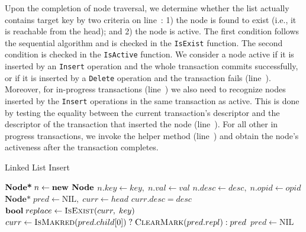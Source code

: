 \documentclass[10pt,conference,compsocconf]{IEEEtran}
\newcommand\NIL{\text{NIL}}
\newcommand\TRUE{\text{\textbf{true}}}
\begin{document}
Upon the completion of node traversal, we determine whether the list actually contains target key by two criteria on line~: 1) the node is found to exist (i.e., it is reachable from the head); and 2) the node is active.
The first condition follows the sequential algorithm and is checked in the \texttt{IsExist} function.
The second condition is checked in the \texttt{IsActive} function.
We consider a node active if it is inserted by an \texttt{Insert} operation and the whole transaction commits successfully, or if it is inserted by a \texttt{Delete} operation and the transaction fails (line~).
Moreover, for in-progress transactions (line~) we also need to recognize nodes inserted by the \texttt{Insert} operations in the same transaction as active. %
This is done by testing the equality between the current transaction's descriptor and the descriptor of the transaction that inserted the node (line~).
For all other in progress transactions, we invoke the helper method (line~) and obtain the node's activeness after the transaction completes. %

\begin{algorithm}[t]
    \caption{Linked List Insert}
    \label{alg:listinsert}
    \begin{algorithmic}[1]
        \State $\textbf{Node*}\; n \gets \text{\textbf{new Node}}$
        \State $n.key \gets key,\;n.val \gets val$
        \State $n.desc \gets desc,\;n.opid \gets opid$
        \State $\textbf{Node*}\; pred \gets \NIL,\;curr \gets head$
        \While{\TRUE} \label{l:listinsertwhile}
        \State {}
         \label{l:listinsertcontain}
        \State \Return $curr.desc = desc$ \label{l:listinsertdesc}
        \EndIf
        \State $\textbf{bool}\; replace \gets \Call{IsExist}{curr,\;key}$ \label{l:listinsertexist}
         \label{l:listinsertreplace}
        \State \Return \TRUE
        \Else
        \State $curr \gets \textsc{IsMakred}(pred.child[0]) \;?\; \hfill \break  \textsc{ClearMark}(pred.repl) : pred$ \label{l:listinsertpred}
        \State $pred \gets \NIL$ 
        \EndIf
        \EndWhile
        \EndFunction
    \end{algorithmic}
\end{algorithm}
\end{document}
